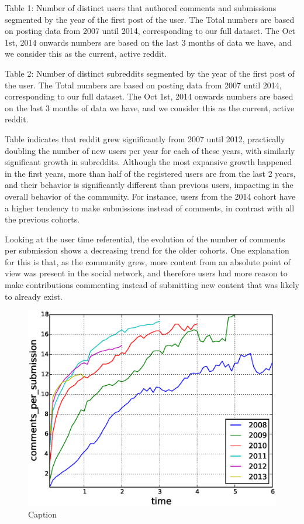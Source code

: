 Table 1: Number of distinct users that authored comments and submissions segmented by the year of the first post of the user. The Total numbers are based on posting data from 2007 until 2014, corresponding to our full dataset. The Oct 1st, 2014 onwards numbers are based on the last 3 months of data we have, and we consider this as the current, active reddit.


Table 2: Number of distinct subreddits segmented by the year of the first post of the user. The Total numbers are based on posting data from 2007 until 2014, corresponding to our full dataset. The Oct 1st, 2014 onwards numbers are based on the last 3 months of data we have, and we consider this as the current, active reddit.

Table indicates that reddit grew significantly from 2007 until 2012, practically doubling the number of new users per year for each of these years, with similarly significant growth in subreddits. Although the most expansive growth happened in the first years, more than half of the registered users are from the last 2 years, and their behavior is significantly different than previous users, impacting in the overall behavior of the community. For instance, users from the 2014 cohort have a higher tendency to make submissions instead of comments, in contrast with all the previous cohorts.

Looking at the user time referential, the evolution of the number of comments per submission shows a decreasing trend for the older cohorts. One explanation for this is that, as the community grew, more content from an absolute point of view was present in the social network, and therefore users had more reason to make contributions commenting instead of submitting new content that was likely to already exist.

\begin{figure}[!tb]
\centering
\includegraphics[scale=0.4]{./images/comments_per_submissions_cohorts.eps}
\caption{Caption}
\label{fig:comments_per_submissions_cohorts}
\end{figure}


